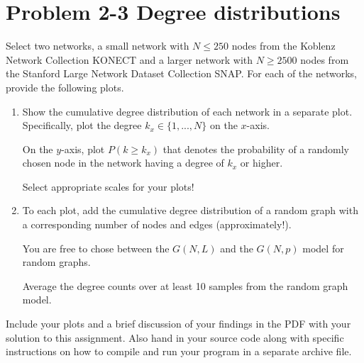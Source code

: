 \section{Problem 2-3 Degree distributions}

Select two networks, a small network with $N \le 250$ nodes from the Koblenz Network Collection KONECT and a larger network with $N \ge 2500$ nodes from the Stanford Large Network Dataset Collection SNAP. For each of the networks, provide the following plots. 

\begin{enumerate}
 \item Show the cumulative degree distribution of each network in a separate plot. Specifically, plot the degree $k_x \in \{1,...,N\}$ on the $x$-axis. 
 
 On the $y$-axis, plot $P(k \ge k_x)$ that denotes the probability of a randomly chosen node in the network having a degree of $k_x$ or higher. 
 
 Select appropriate scales for your plots!
 
 \item To each plot, add the cumulative degree distribution of a random graph with a corresponding number of nodes and edges (approximately!). 
 
 You are free to chose between the $G(N,L)$ and the $G(N,p)$ model for random graphs. 
 
 Average the degree counts over at least 10 samples from the random graph model. 
 
\end{enumerate}

Include your plots and a brief discussion of your findings in the PDF with your solution to this assignment. Also hand in your source code along with specific instructions on how to compile and run your program in a separate archive file.

